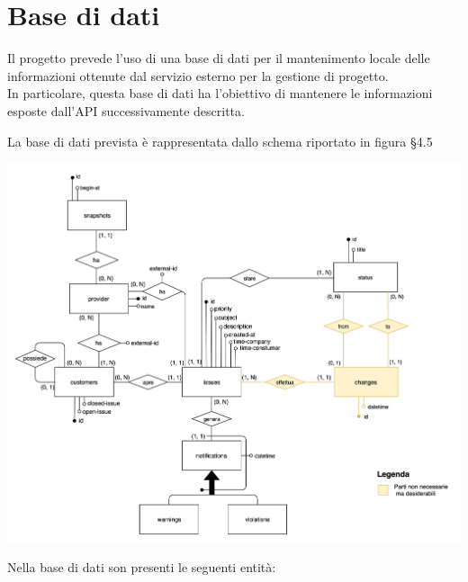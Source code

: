 \section{Base di dati}
    Il progetto prevede l'uso di una base di dati per il mantenimento locale delle informazioni ottenute dal servizio esterno per la gestione di progetto. \\
    In particolare, questa base di dati ha l'obiettivo di mantenere le informazioni esposte dall'API successivamente descritta. \\
    \par La base di dati prevista è rappresentata dallo schema riportato in figura \S 4.5
    \begin{center}
        \includegraphics[keepaspectratio = true, width=15cm]{immagini/progettazione/db.png}
    \end{center}
	Nella base di dati son presenti le seguenti entità:
